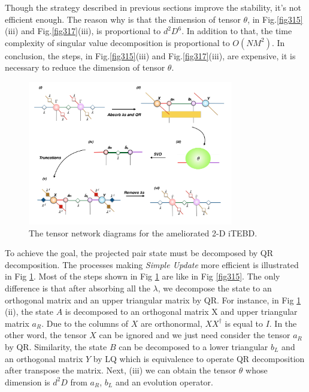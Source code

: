 Though the strategy described in previous sections improve the stability, it's not efficient enough. The reason why is that the dimension of tensor $\theta$, in Fig.\ref{fig315}(iii) and Fig.\ref{fig317}(iii), is proportional to $d^2D^6$. In addition to that, the time complexity of singular value decomposition is proportional to $O(NM^2)$. In conclusion, the steps, in Fig.\ref{fig315}(iii) and Fig.\ref{fig317}(iii), are expensive, it is necessary to reduce the dimension of tensor $\theta$. 
\label{2doptQR} \begin{figure}[H] \centering \includegraphics[width=0.80\textwidth]{figures/fig318.png} \caption[The tensor network diagrams for the ameliorated 2-D iTEBD with QR decompositiont]{The tensor network diagrams for the ameliorated 2-D iTEBD.} \label{fig318} \end{figure} To achieve the goal, the projected pair state must be decomposed by QR decomposition. The processes making \textit{Simple Update} more efficient is illustrated in Fig \ref{fig318}.  Most of the steps shown in Fig \ref{fig318} are like in Fig \ref{fig315}. The only difference is that after absorbing all the $\lambda$, we decompose the state to an orthogonal matrix and an upper triangular matrix by QR. For instance, in Fig \ref{fig318} (ii), the state $A$ is decomposed to an orthogonal matrix X and upper triangular matrix $a_R$. Due to the columns of $X$ are orthonormal, $XX^{\dagger}$ is equal to $I$. In the other word, the tensor $X$ can be ignored and we just need consider the tensor $a_R$ by QR. Similarity, the state $B$ can be decomposed to a lower triangular $b_L$ and an orthogonal matrix $Y$ by LQ which is equivalence to operate QR decomposition after transpose the matrix. Next, (iii) we can obtain the tensor $\theta$ whose dimension is $d^2D$ from $a_R$, $b_L$ and an evolution operator.


